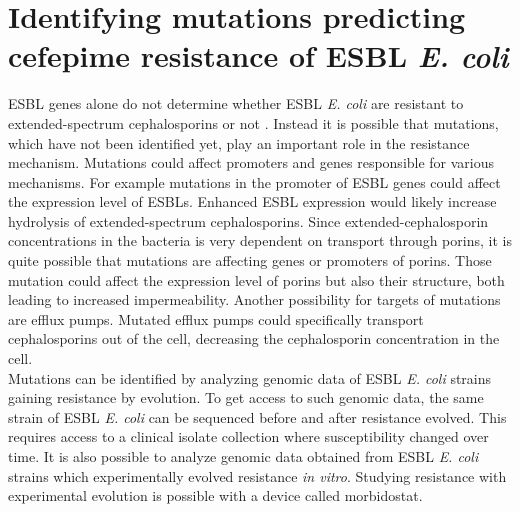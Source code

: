 \section{Identifying mutations predicting cefepime resistance of ESBL \textit{E. coli}}
ESBL genes alone do not determine whether ESBL \textit{E. coli} are resistant to extended-spectrum cephalosporins or not \cite{hombach_consequences_2013}. Instead it is possible that mutations, which have not been identified yet, play an important role in the resistance mechanism. Mutations could affect promoters and genes responsible for various mechanisms. For example mutations in the promoter of ESBL genes could affect the expression level of ESBLs. Enhanced ESBL expression would likely increase hydrolysis of extended-spectrum cephalosporins. Since extended-cephalosporin concentrations in the bacteria is very dependent on transport through porins, it is quite possible that mutations are affecting genes or promoters of porins. Those mutation could affect the expression level of porins but also their structure, both leading to increased impermeability. Another possibility for targets of mutations are efflux pumps. Mutated efflux pumps could specifically transport cephalosporins out of the cell, decreasing the cephalosporin concentration in the cell. \\
Mutations can be identified by analyzing genomic data of  ESBL \textit{E. coli} strains gaining resistance by evolution. To get access to such genomic data, the same strain of ESBL \textit{E. coli} can be sequenced before and after resistance evolved. This requires access to a clinical isolate collection where susceptibility changed over time. It is also possible to analyze genomic data obtained from ESBL \textit{E. coli} strains which experimentally evolved resistance \textit{in vitro}. Studying resistance with experimental evolution is possible with a device called morbidostat.

